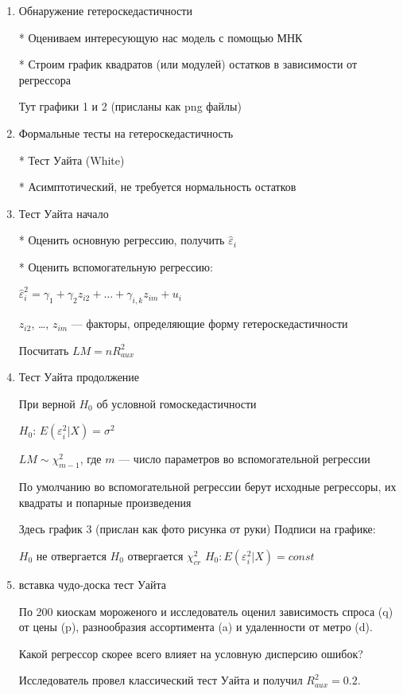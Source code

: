 \documentclass[12pt,a4paper]{article}
\begin{document}
{\begin{enumerate}
\newpage
\item Обнаружение гетероскедастичности

* Оцениваем интересующую нас модель с помощью МНК

* Строим график квадратов (или модулей) остатков в зависимости от регрессора

Тут графики 1 и 2 (присланы как png файлы)


\item Формальные тесты на гетероскедастичность

* Тест Уайта (White)

* Асимптотический, не требуется нормальность остатков

\item Тест Уайта  начало

* Оценить основную регрессию, получить $\hat{\varepsilon}_i$

* Оценить вспомогательную регрессию:

$\hat{\varepsilon}^2_i = \gamma_1 + \gamma_2 z_{i2} + \ldots + \gamma_{i,k} z_{im}+ u_i$

$z_{i2}$, \ldots, $z_{im}$ --- факторы, определяющие форму гетероскедастичности

Посчитать $LM=nR^2_{aux}$

\newpage
\item Тест Уайта продолжение

При верной $H_0$ об условной гомоскедастичности

$H_0$: $E(\varepsilon^2_i|X)=\sigma^2$

$LM \sim \chi^2_{m-1}$, где $m$ --- число параметров во вспомогательной регрессии

По умолчанию во вспомогательной регрессии берут исходные регрессоры, их квадраты и попарные произведения

Здесь график 3 (прислан как фото рисунка от руки)
Подписи на графике:

$H_0$ не отвергается
$H_0$ отвергается
$\chi^2_{cr}$
$H_0: E(\varepsilon_i^2 | X)=const$

\item вставка чудо-доска тест Уайта

По 200 киоскам мороженого и  исследователь оценил зависимость спроса (q) от цены (p), разнообразия ассортимента (a) и удаленности от метро (d).

Какой регрессор скорее всего влияет на условную дисперсию ошибок?

Исследователь провел классический тест Уайта и получил $R^2_{aux}=0.2$.


\end{enumerate}}
\end{document}
